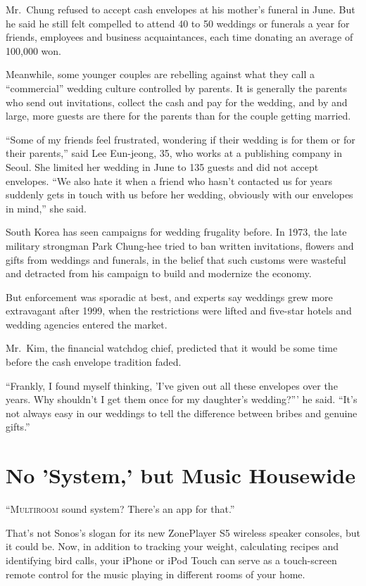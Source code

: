 ﻿\documentclass[12pt]{article}
\begin{document}
Mr.~Chung refused to accept cash envelopes at his mother's funeral in June. But he said he still
felt compelled to attend 40 to 50 weddings or funerals a year for friends, employees and business
acquaintances, each time donating an average of 100,000 won.

Meanwhile, some younger couples are rebelling against what they call a ``commercial'' wedding
culture controlled by parents. It is generally the parents who send out invitations, collect the
cash and pay for the wedding, and by and large, more guests are there for the parents than for the
couple getting married.

``Some of my friends feel frustrated, wondering if their wedding is for them or for their parents,''
said Lee Eun-jeong, 35, who works at a publishing company in Seoul. She limited her wedding in June
to 135 guests and did not accept envelopes. ``We also hate it when a friend who hasn't contacted us
for years suddenly gets in touch with us before her wedding, obviously with our envelopes in mind,''
she said.

South Korea has seen campaigns for wedding frugality before. In 1973, the late military strongman
Park Chung-hee tried to ban written invitations, flowers and gifts from weddings and funerals, in
the belief that such customs were wasteful and detracted from his campaign to build and modernize
the economy.

But enforcement was sporadic at best, and experts say weddings grew more extravagant after 1999,
when the restrictions were lifted and five-star hotels and wedding agencies entered the market.

Mr.~Kim, the financial watchdog chief, predicted that it would be some time before the cash envelope
tradition faded.

``Frankly, I found myself thinking, 'I've given out all these envelopes over the years. Why
shouldn't I get them once for my daughter's wedding?''' he said. ``It's not always easy in our
weddings to tell the difference between bribes and genuine gifts.''

\section{No 'System,' but Music Housewide}

\lettrine{``M}{ultiroom} sound system? There's an app for that.''

That's not Sonos's slogan for its new ZonePlayer S5 wireless speaker consoles, but it could be. Now,
in addition to tracking your weight, calculating recipes and identifying bird calls, your iPhone or
iPod Touch can serve as a touch-screen remote control for the music playing in different rooms of
your home.
\end{document}
